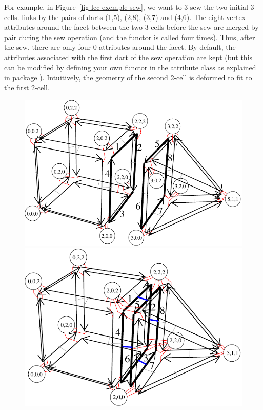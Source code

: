 For example, in Figure~\ref{fig-lcc-exemple-sew}, we want to 3-sew the
two initial 3-cells.  links by \betatrois{} the pairs
of darts (1,5), (2,8), (3,7) and (4,6). The eight vertex attributes
around the facet between the two 3-cells before the sew are merged by
pair during the sew operation (and the  functor is
called four times). Thus, after the sew, there are only four
0-attributes around the facet. By default, the attributes associated
with the first dart of the sew operation are kept (but this can be
modified by defining your own functor in the attribute class as
explained in package ). Intuitively, the
geometry of the second 2-cell is deformed to fit to the first 2-cell.
%
\def\LargFig{.45\textwidth}
\begin{figure}
  \begin{ccTexOnly}
    \begin{center}
      \includegraphics[width=\LargFig]{Linear_cell_complex/fig/pdf/exemple-carte-with_point_3d-sew}\qquad
      \includegraphics[width=\LargFig]{Linear_cell_complex/fig/pdf/exemple-carte-with_point_3d-sew2}

\end{center}
\end{ccTexOnly}
\end{figure}
